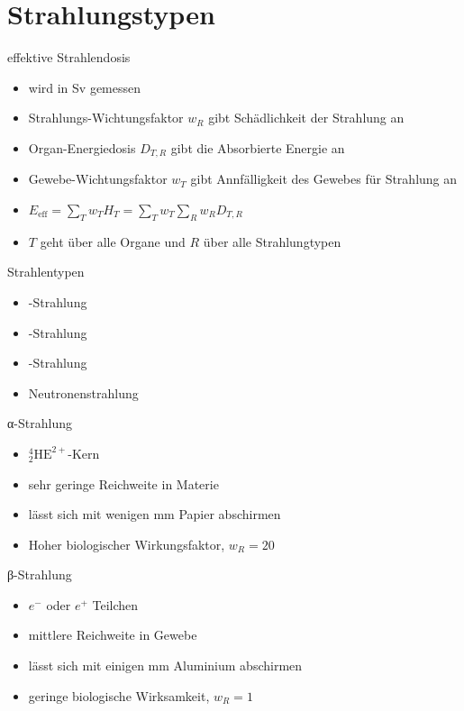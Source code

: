 \section{Strahlungstypen}
\begin{frame}{effektive Strahlendosis}
\begin{itemize}
	\item wird in \si{\sievert} gemessen
	\item Strahlungs-Wichtungsfaktor $w_R$ gibt Schädlichkeit der Strahlung an
	\item Organ-Energiedosis $D_{T,R}$ gibt die Absorbierte Energie an
	\item Gewebe-Wichtungsfaktor $w_T$ gibt Annfälligkeit des Gewebes für Strahlung an
	\item $E_\mathrm{eff}=\sum_T w_TH_T =\sum_T w_T \sum_R w_RD_{T,R}$
	\item $T$ geht über alle Organe und $R$ über alle Strahlungtypen
\end{itemize}
\end{frame}
\begin{frame}{Strahlentypen}
	\begin{itemize}
		\item \alpha-Strahlung
		\item \beta-Strahlung
		\item \gamma-Strahlung
		\item Neutronenstrahlung
	\end{itemize}
\end{frame}
\begin{frame}{α-Strahlung}
	\begin{itemize}
		\item ${}^4_2\text{HE}^{2+}$-Kern
		\item sehr geringe Reichweite in Materie
		\item lässt sich mit wenigen \si{\milli \meter} Papier abschirmen
		\item Hoher biologischer Wirkungsfaktor, $w_R=20$
	\end{itemize}
\end{frame}
\begin{frame}{β-Strahlung}
\begin{itemize}
	\item $e^-$ oder $e^+$ Teilchen
	\item mittlere Reichweite in Gewebe
	\item lässt sich mit einigen \si{\milli \meter} Aluminium abschirmen
	\item geringe biologische Wirksamkeit, $w_R=1$
\end{itemize}
\end{frame}
